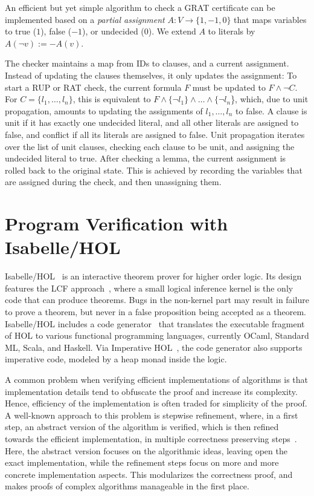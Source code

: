 \documentclass{llncs}
\begin{document}
An efficient but yet simple algorithm to check a GRAT certificate can be implemented based on a \emph{partial assignment} $A: V \to \{1,-1,0\}$
that maps variables to true ($1$), false ($-1$), or undecided ($0$). We extend $A$ to literals by $A(\neg v) := -A(v)$.

The checker maintains a map from IDs to clauses, and a current assignment. Instead of updating the clauses themselves, it only updates the assignment:
To start a RUP or RAT check, the current formula $F$ must be updated to $F \wedge \neg C$. For  $C=\{l_1,\ldots,l_n\}$, this is
equivalent to $F \wedge \{\neg l_1\} \wedge \ldots \wedge \{\neg l_n$\}, which, due to unit propagation, amounts to 
updating the assignments of $l_1,\ldots,l_n$ to false.
A clause is unit if it has exactly one undecided literal, and all other literals are assigned to false, and conflict if all its literals are assigned to false.
Unit propagation iterates over the list of unit clauses, checking each clause to be unit, and assigning the undecided literal to true.
After checking a lemma, the current assignment is rolled back to the original state. This is achieved by recording the variables that are assigned during the check, 
and then unassigning them.


\section{Program Verification with Isabelle/HOL}\label{sec:imp_ref_framework}
Isabelle/HOL~\cite{NPW02} is an interactive theorem prover for higher order logic. Its design features the LCF approach~\cite{Gord00}, where 
a small logical inference kernel is the only code that can produce theorems. Bugs in the non-kernel part may result in failure to 
prove a theorem, but never in a false proposition being accepted as a theorem.
Isabelle/HOL includes a code generator~\cite{Haft09,HaNi10,HKKN13} that translates the executable fragment of HOL to various functional programming languages, 
currently OCaml, Standard ML, Scala, and Haskell.
Via Imperative HOL~\cite{BKHEM08}, the code generator also supports imperative code, modeled by a heap monad inside the logic.

A common problem when verifying efficient implementations of algorithms is that implementation details tend to obfuscate the proof and increase its complexity. 
Hence, efficiency of the implementation is often traded for simplicity of the proof.
A well-known approach to this problem is stepwise refinement, where, in a first step, an abstract version of the algorithm is verified,
which is then refined towards the efficient implementation, in multiple correctness preserving steps~\cite{Wirth71,Back78,BaWr98}. Here, the abstract version focuses on the 
algorithmic ideas, leaving open the exact implementation, while the refinement steps focus on more and more concrete implementation aspects.
This modularizes the correctness proof, and makes proofs of complex algorithms manageable in the first place.
\end{document}
